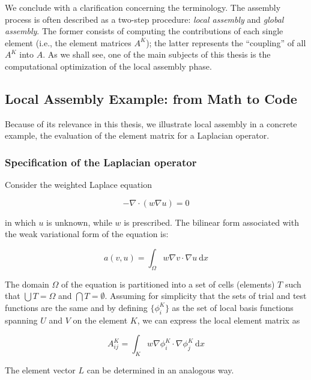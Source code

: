 We conclude with a clarification concerning the terminology. The assembly process is often described as a two-step procedure: {\em local assembly}  and {\em global assembly}. The former consists of computing the contributions of each single element (i.e., the element matrices $A^K$); the latter represents the ``coupling'' of all $A^K$ into $A$. As we shall see, one of the main subjects of this thesis is the computational optimization of the local assembly phase.

\subsection{Local Assembly Example: from Math to Code}
\label{sec:bkg:math-to-code}
Because of its relevance in this thesis, we illustrate local assembly in a concrete example, the evaluation of the element matrix for a Laplacian operator. 

\subsubsection{Specification of the Laplacian operator}
Consider the weighted Laplace equation

\begin{equation}
- \nabla \cdot (w \nabla u) = 0
\end{equation}

in which $u$ is unknown, while $w$ is prescribed. The bilinear form associated with the weak variational form of the equation is:

\begin{equation}
\label{sec:bkg:eq:spec-laplacian}
a(v, u) = \int_\Omega w \nabla v \cdot \nabla u\ \mathrm{d}x
\end{equation}

The domain $\Omega$ of the equation is partitioned into a set of cells (elements) $T$ such that $\bigcup T = \Omega$ and $\bigcap T = \emptyset$. Assuming for simplicity that the sets of trial and test functions are the same and by defining $\lbrace \phi_i^K \rbrace$ as the set of local basis functions spanning $U$ and $V$ on the element $K$, we can express the local element matrix as

\begin{equation}
\label{sec:bkg:stiffness}
A_{ij}^K = \int_K w \nabla \phi_i^K \cdot \nabla \phi_j^K\ \mathrm{d}x
\end{equation}

The element vector $L$ can be determined in an analogous way. 

